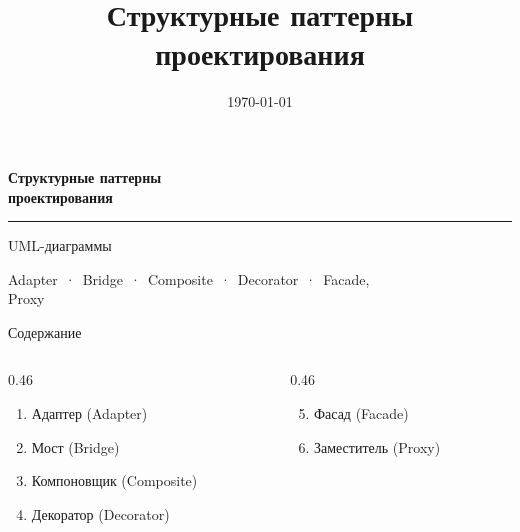 \documentclass[aspectratio=169,10pt]{beamer}
\title{Структурные паттерны проектирования}
\date{\today}
\begin{document}
\begin{frame}[plain]
  \vfill
  \centering
  {\color{main}\fontsize{26}{31}\selectfont\bfseries Структурные паттерны\\проектирования\par}
  \vspace{5mm}
  {\color{accent}\rule{6cm}{1.2pt}\par}
  \vspace{5mm}
  {\large UML-диаграммы\par}
  \vspace{7mm}
  {\small Adapter \,·\, Bridge \,·\, Composite \,·\, Decorator \,·\, Facade, \\[1mm]
  Proxy\par}
  \vfill
\end{frame}

\begin{frame}{Содержание}
  \begin{columns}[T]
    \begin{column}{0.46\textwidth}
      \begin{enumerate}\setlength\itemsep{3pt}
        \item Адаптер (Adapter)
        \item Мост (Bridge)
        \item Компоновщик (Composite)
        \item Декоратор (Decorator)
      \end{enumerate}
    \end{column}
    \begin{column}{0.46\textwidth}
      \begin{enumerate}\setcounter{enumi}{4}\setlength\itemsep{3pt}
        \item Фасад (Facade)
        \item Заместитель (Proxy)
      \end{enumerate}
    \end{column}
  \end{columns}
\end{frame}
\end{document}
